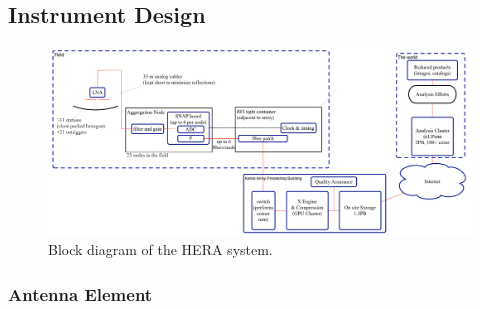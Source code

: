 \documentclass[preprint]{aastex}
\begin{document}
\vspace{-0.25in}
\subsection{Instrument Design}
\vspace{-6pt}
\label{InstDes}
%
%

\begin{figure}[h]
\centering
\includegraphics[width=\textwidth]{plots/Engineering/HERA_high_level_block_diagram.png}
\caption{\small
Block diagram of the HERA system.}
\label{fig:blockDiagram} 
\end{figure}

\vspace{-0.25in}
\subsubsection{Antenna Element}
\vspace{-6pt}
\end{document}
